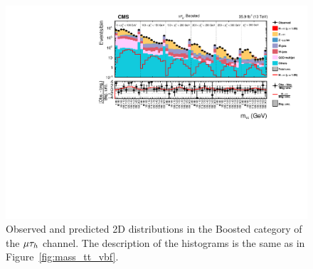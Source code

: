 \begin{figure}[htbp]
\centering
     \includegraphics[width=1.0\textwidth]{higgs_to_taus/plots/Figure_011.pdf}
     \caption{Observed and predicted 2D distributions in the Boosted category of the $\mu\tau_{h}$ channel. The description of the histograms is the same as in Figure~\ref{fig:mass_tt_vbf}.}
     \label{fig:mass_mt_boosted}
\end{figure}

%

